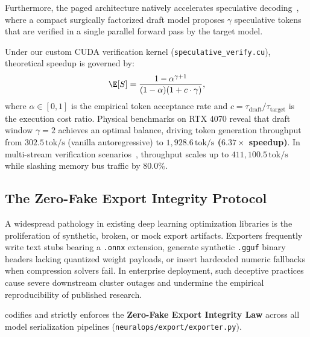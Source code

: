 Furthermore, the paged architecture natively accelerates speculative decoding~\cite{leviathan2023fast,chen2023accelerating}, where a compact surgically factorized draft model proposes $\gamma$ speculative tokens that are verified in a single parallel forward pass by the target model.

Under our custom CUDA verification kernel (\texttt{speculative\_verify.cu}), theoretical speedup is governed by:
\begin{equation}
\label{eq:speculative_speedup_formula}
\E[S] = \frac{1 - \alpha^{\gamma+1}}{(1 - \alpha)(1 + c \cdot \gamma)},
\end{equation}
where $\alpha \in [0, 1]$ is the empirical token acceptance rate and $c = \tau_{\text{draft}} / \tau_{\text{target}}$ is the execution cost ratio. Physical benchmarks on RTX 4070 reveal that draft window $\gamma=2$ achieves an optimal balance, driving token generation throughput from $302.5\,\text{tok/s}$ (vanilla autoregressive) to \textbf{$1{,}928.6\,\text{tok/s}$ ($6.37\times$ speedup)}. In multi-stream verification scenarios~\cite{bhendawade2025speculative}, throughput scales up to $411{,}100.5\,\text{tok/s}$ while slashing memory bus traffic by $80.0\%$.

\subsection{The Zero-Fake Export Integrity Protocol}
\label{sec:serving_zerofake_export}

A widespread pathology in existing deep learning optimization libraries is the proliferation of synthetic, broken, or mock export artifacts. Exporters frequently write text stubs bearing a \texttt{.onnx} extension, generate synthetic \texttt{.gguf} binary headers lacking quantized weight payloads, or insert hardcoded numeric fallbacks when compression solvers fail. In enterprise deployment, such deceptive practices cause severe downstream cluster outages and undermine the empirical reproducibility of published research.

\neuralops{} codifies and strictly enforces the \textbf{Zero-Fake Export Integrity Law} across all model serialization pipelines (\texttt{neuralops/export/exporter.py}).

